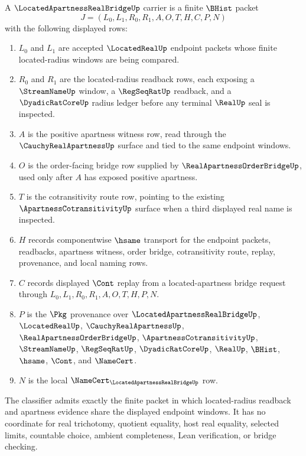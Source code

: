 \begin{definition}
\label{def:located-apartness-real-bridge-carrier}
A $\LocatedApartnessRealBridgeUp$ carrier is a finite $\BHist$ packet
$$
J=(L_0,L_1,R_0,R_1,A,O,T,H,C,P,N)
$$
with the following displayed rows:
\begin{enumerate}
\item $L_0$ and $L_1$ are accepted $\LocatedRealUp$ endpoint packets whose finite located-radius windows are being compared.
\item $R_0$ and $R_1$ are the located-radius readback rows, each exposing a $\StreamNameUp$ window, a $\RegSeqRatUp$ readback, and a $\DyadicRatCoreUp$ radius ledger before any terminal $\RealUp$ seal is inspected.
\item $A$ is the positive apartness witness row, read through the $\CauchyRealApartnessUp$ surface and tied to the same endpoint windows.
\item $O$ is the order-facing bridge row supplied by $\RealApartnessOrderBridgeUp$, used only after $A$ has exposed positive apartness.
\item $T$ is the cotransitivity route row, pointing to the existing $\ApartnessCotransitivityUp$ surface when a third displayed real name is inspected.
\item $H$ records componentwise $\hsame$ transport for the endpoint packets, readbacks, apartness witness, order bridge, cotransitivity route, replay, provenance, and local naming rows.
\item $C$ records displayed $\Cont$ replay from a located-apartness bridge request through $L_0,L_1,R_0,R_1,A,O,T,H,P,N$.
\item $P$ is the $\Pkg$ provenance over $\LocatedApartnessRealBridgeUp$, $\LocatedRealUp$, $\CauchyRealApartnessUp$, $\RealApartnessOrderBridgeUp$, $\ApartnessCotransitivityUp$, $\StreamNameUp$, $\RegSeqRatUp$, $\DyadicRatCoreUp$, $\RealUp$, $\BHist$, $\hsame$, $\Cont$, and $\NameCert$.
\item $N$ is the local $\NameCert_{\LocatedApartnessRealBridgeUp}$ row.
\end{enumerate}
The classifier admits exactly the finite packet in which located-radius readback and apartness evidence share the displayed endpoint windows. It has no coordinate for real trichotomy, quotient equality, host real equality, selected limits, countable choice, ambient completeness, Lean verification, or bridge checking.
\end{definition}

